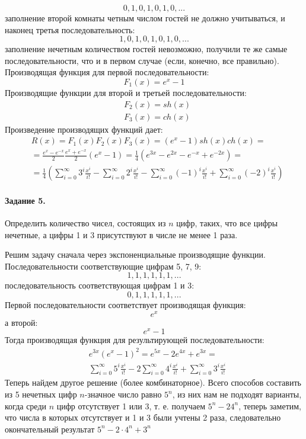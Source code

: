 \documentclass[a4paper,12pt]{article}
\begin{document}
\begin{Solution}
\[
	0, 1, 0, 1, 0, 1, 0, ...
\]
заполнение второй комнаты четным числом гостей не должно учитываться, и наконец третья последовательность:
\[
	1, 0, 1, 0, 1, 0, 1, 0, ...
\]
заполнение нечетным количеством гостей невозможно, получили те же самые последовательности, что и в первом случае (если, конечно, все правильно). Производящая функция для первой последовательности:
\[
	F_1\left(x\right) = e^x - 1
\]
Производящие функции для второй и третьей последовательности:
\[
	\begin{split}
		& F_2\left(x\right) = sh\left(x\right) \\
		& F_3\left(x\right) = ch\left(x\right)
	\end{split}
\]
Произведение производящих функций дает:
\[
	\begin{split}
		& R\left(x\right) = F_1\left(x\right) F_2\left(x\right) F_3\left(x\right) = \left(e^x - 1\right) sh\left(x\right) ch\left(x\right) = \\
		& = \frac{e^x - e^{-x}}{2} \frac{e^x + e^{-x}}{2} \left(e^x - 1\right) = \frac{1}{4} \left(e^{3x} - e^{2x} - e^{-x} + e^{-2x}\right) = \\
		& = \frac{1}{4} \left(\sum_{i=0}^{\infty} 3^i \frac{x^i}{i!} - \sum_{i=0}^{\infty} 2^i \frac{x^i}{i!} - \sum_{i=0}^{\infty} \left(-1\right)^i \frac{x^i}{i!} + \sum_{i=0}^{\infty} \left(-2\right)^i \frac{x^i}{i!}\right)
	\end{split}
\]
\end{Solution}

\paragraph{Задание 5.} Определить количество чисел, состоящих из $n$ цифр, таких, что все цифры нечетные, а цифры 1 и 3 присутствуют в числе не менее 1 раза.

\begin{Solution}
Решим задачу сначала через экспоненциальные производящие функции. Последовательности соответствующие цифрам 5, 7, 9:
\[
	1, 1, 1, 1, 1, 1, ...
\]
последовательность соответствующая цифрам 1 и 3:
\[
	0, 1, 1, 1, 1, 1, ...
\]
Первой последовательности соответствует производящая функция:
\[
	e^x
\]
а второй:
\[
	e^x - 1
\]
Тогда производящая функция для результирующей последовательности:
\[
	\begin{split}
		& e^{3x} \left(e^x-1\right)^2 = e^{5x} - 2 e^{4x} + e^{3x} = \\
		& \sum_{i=0}^{\infty} 5^i \frac{x^i}{i!} - 2 \sum_{i=0}^{\infty} 4^i \frac{x^i}{i!} + \sum_{i=0}^{\infty} 3^i \frac{x^i}{i!}
	\end{split}
\]
Теперь найдем другое решение (более комбинаторное). Всего способов составить из 5 нечетных цифр $n$-значное число равно $5^n$, из них нам не подходят варианты, когда среди $n$ цифр отсутствует 1 или 3, т. е. получаем $5^n - 2 4^n$, теперь заметим, что числа в которых отсутствует и 1 и 3 были учтены 2 раза, следовательно окончательный результат $5^n - 2 \cdot 4^n + 3^n$
\end{Solution}
\end{document}
